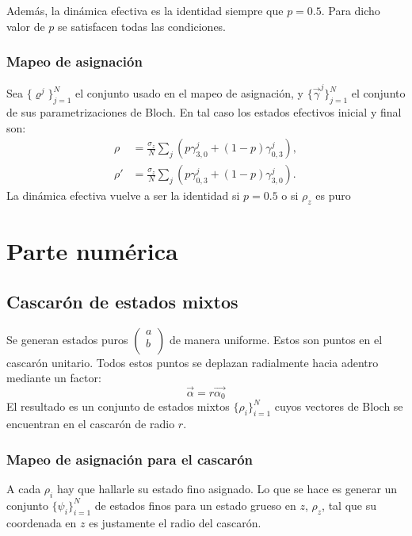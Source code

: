 Además, la dinámica efectiva es la identidad siempre que $p=0.5$. Para dicho valor de $p$ se satisfacen todas las condiciones.

\subsubsection{Mapeo de asignación}

Sea $\{\varrho^{j}\}_{j=1}^{N}$ el conjunto usado en el mapeo de asignación, y $\{\vec{\gamma}^{j}\}_{j=1}^{N}$ el conjunto de sus parametrizaciones de Bloch. En tal caso los estados efectivos inicial y final son:
\begin{align}
\rho&=\frac{\sigma_{z}}{N}\sum_{j}(p\gamma_{3,0}^{j}+(1-p)\gamma_{0,3}^{j}),\\
\rho'&=\frac{\sigma_{z}}{N}\sum_{j}(p\gamma_{0,3}^{j}+(1-p)\gamma_{3,0}^{j}).
\end{align}
La dinámica efectiva vuelve a ser la identidad si $p=0.5$ o si $\rho_{z}$ es puro


\newpage


\section{Parte numérica}
\subsection{Cascarón de estados mixtos}
Se generan estados puros $\begin{pmatrix}
a\\
b\\ \end{pmatrix}$ de manera uniforme. Estos son puntos en el cascarón unitario. Todos estos puntos se deplazan radialmente hacia adentro mediante un factor:
\begin{equation}
\vec{\alpha}=r\vec{\alpha_{0}}
\end{equation}
El resultado es un conjunto de estados mixtos $\{\rho_{i}\}_{i=1}^{N}$ cuyos vectores de Bloch se encuentran en el cascarón de radio $r$.

\subsubsection{Mapeo de asignación para el cascarón}


A cada $\rho_{i}$ hay que hallarle su estado fino asignado. Lo que se hace es generar un conjunto $\{\psi_{i}\}_{i=1}^{N}$ de estados finos para un estado grueso en $z$, $\rho_{z}$, tal que su coordenada en $z$ es justamente el radio del cascarón.

